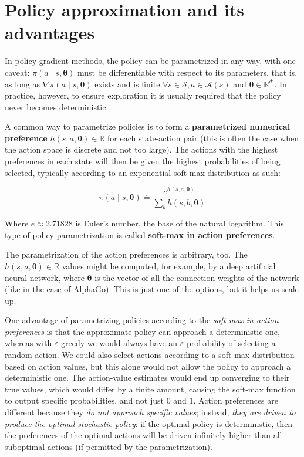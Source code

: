 \section{Policy approximation and its advantages}
In policy gradient methods, the policy can be parametrized in any way, with one caveat: $\pi \left( a \middle\vert s, \boldsymbol{\theta} \right)$ must be differentiable with respect to its parameters, that is, as long as $\nabla \pi \left( a \middle\vert s, \boldsymbol{\theta} \right)$ exists and is finite $\forall s \in \mathcal{S}, a \in \mathcal{A}(s)$ and $\boldsymbol{\theta} \in \mathbb{R}^{d'}$. In practice, however, to ensure exploration it is usually required that the policy never becomes deterministic.

A common way to parametrize policies is to form a \textbf{parametrized numerical preference} $h(s,a,\boldsymbol{\theta}) \in \mathbb{R}$ for each state-action pair (this is often the case when the action space is discrete and not too large). The actions with the highest preferences in each state will then be given the highest probabilities of being selected, typically according to an exponential soft-max distribution as such:

\begin{equation}
    \pi \left(a \middle\vert s, \boldsymbol{\theta} \right) \doteq \frac{e^{h(s,a,\boldsymbol{\theta})}}{\sum_{b} h(s,b,\boldsymbol{\theta})}
    \label{eq:ch8-softmaxinactionpreferencesparametrization}
\end{equation}

Where $e \approx 2.71828$ is Euler’s number, the base of the natural logarithm. This type of policy parametrization is called \textbf{soft-max in action preferences}.

The parametrization of the action preferences is arbitrary, too. The $h(s,a,\boldsymbol{\theta}) \in \mathbb{R}$ values might be computed, for example, by a deep artificial neural network, where $\boldsymbol{\theta}$ is the vector of all the connection weights of the network (like in the case of AlphaGo). This is just one of the options, but it helps us scale up.

One advantage of parametrizing policies according to the \textit{soft-max in action preferences} is that the approximate policy can approach a deterministic one, whereas with $\varepsilon$-greedy we would always have an $\varepsilon$ probability of selecting a random action. We could also select actions according to a soft-max distribution based on action values, but this alone would not allow the policy to approach a deterministic one. The action-value estimates would end up converging to their true values, which would differ by a finite amount, causing the soft-max function to output specific probabilities, and not just 0 and 1. Action preferences are different because they \textit{do not approach specific values}; instead, \textit{they are driven to produce the optimal stochastic policy}: if the optimal policy is deterministic, then the preferences of the optimal actions will be driven infinitely higher than all suboptimal actions (if permitted by the parametrization).

